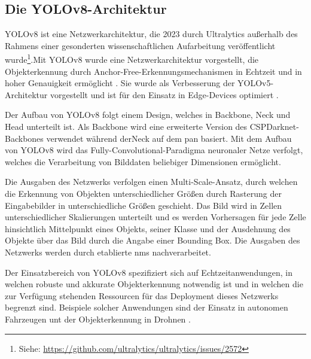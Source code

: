 
\subsection{Die YOLOv8-Architektur}
\label{sec:was_yolov8}

YOLOv8 ist eine Netzwerkarchitektur, die 2023 durch Ultralytics außerhalb des Rahmens einer gesonderten wissenschaftlichen Aufarbeitung veröffentlicht wurde\footnote{Siehe: \url{https://github.com/ultralytics/ultralytics/issues/2572}}.Mit YOLOv8 wurde eine Netzwerkarchitektur vorgestellt, die Objekterkennung durch Anchor-Free-Erkennungsmechanismen in Echtzeit und in hoher Genauigkeit ermöglicht \cite{yolov1_to_yolov8}. Sie wurde als Verbesserung der YOLOv5-Architektur vorgestellt und ist für den Einsatz in Edge-Devices optimiert \cite{yolov8_comparison}.

Der Aufbau von YOLOv8 folgt einem Design, welches in Backbone, Neck und Head unterteilt ist. Als Backbone wird eine erweiterte Version des CSPDarknet-Backbones verwendet während derNeck auf dem \ac{pan} basiert. Mit dem Aufbau von YOLOv8 wird das Fully-Convolutional-Paradigma neuronaler Netze verfolgt, welches die Verarbeitung von Bilddaten beliebiger Dimensionen ermöglicht.

Die Ausgaben des Netzwerks verfolgen einen Multi-Scale-Ansatz, durch welchen die Erkennung von Objekten unterschiedlicher Größen durch Rasterung der Eingabebilder in unterschiedliche Größen geschieht. Das Bild wird in Zellen unterschiedlicher Skalierungen unterteilt und es werden Vorhersagen für jede Zelle hinsichtlich Mittelpunkt eines Objekts, seiner Klasse und der Ausdehnung des Objekte über das Bild durch die Angabe einer Bounding Box. Die Ausgaben des Netzwerks werden durch etablierte \ac{nms} nachverarbeitet.

Der Einsatzbereich von YOLOv8 spezifiziert sich auf Echtzeitanwendungen, in welchen robuste und akkurate Objekterkennung notwendig ist und in welchen die zur Verfügung stehenden Ressourcen für das Deployment dieses Netzwerks begrenzt sind. Beispiele solcher Anwendungen sind der Einsatz in autonomen Fahrzeugen unt der Objekterkennung in Drohnen \cite{yolov8_car,yolov8_drone}.

